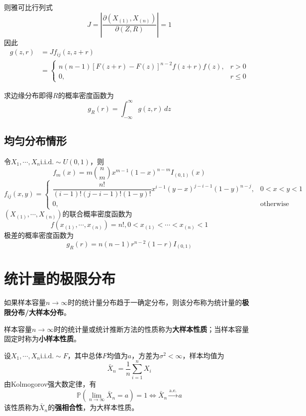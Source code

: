 \documentclass{ctexbook}
\newcommand{\iid}{\text{i.i.d.}}          %
\newcommand{\aee}{\text{a.e.}}             %
\begin{document}
则雅可比行列式
$$J=\left|\frac{\partial(X_{(1)},X_{(n)})}{\partial(Z,R)}\right|=1$$
因此\begin{align*}
    g(z,r)&=Jf_{ij}(z,z+r)\\
    &=\begin{cases}
        n(n-1)[F(z+r)-F(z)]^{n-2}f(z+r)f(z),&r>0\\
        0,&r\le 0
    \end{cases}
\end{align*}

求边缘分布即得$R$的概率密度函数为
$$g_R(r)=\int_{-\infty}^{\infty}g(z,r)\,dz$$

\subsection{均匀分布情形}

令$X_1,\cdots,X_n\iid\sim U(0,1)$，则
$$f_m(x)=m\binom{n}{m}x^{m-1}(1-x)^{n-m}I_{(0,1)}(x)$$
$$f_{ij}(x,y)=\begin{cases}
    \dfrac{n!}{(i-1)!(j-i-1)!(1-y)!}x^{i-1}(y-x)^{j-i-1}(1-y)^{n-j},&0<x<y<1\\
    0,&\text{otherwise}
\end{cases}$$
$(X_{(1)},\cdots,X_{(n)})$的联合概率密度函数为
$$f(x_{(1)},\cdots,x_{(n)})=n!,0<x_{(1)}<\cdots<x_{(n)}<1$$
极差的概率密度函数为
$$g_R(r)=n(n-1)r^{n-2}(1-r)I_{(0,1)}$$

\section{统计量的极限分布}

\begin{definition}
    如果样本容量$n\to\infty$时的统计量分布趋于一确定分布，则该分布称为统计量的\textbf{极限分布/大样本分布}。
\end{definition}
\begin{definition}
    样本容量$n\to\infty$时的统计量或统计推断方法的性质称为\textbf{大样本性质}；当样本容量固定时称为\textbf{小样本性质}。    
\end{definition}

\begin{example}[强相合性]
    设$X_1,\cdots,X_n\iid\sim F$，其中总体$F$均值为$a$，方差为$\sigma^2<\infty$，样本均值为
    $$\bar{X}_n=\frac{1}{n}\sum_{i=1}^n X_i$$
    由Kolmogorov强大数定律，有
    $$\mathbb{P} (\lim_{n\to\infty}\bar{X}_n=a)=1\iff \bar{X}_n\xrightarrow{\aee}a$$
    该性质称为$\bar{X}_n$的\textbf{强相合性}，为大样本性质。
\end{example}
\end{document}
